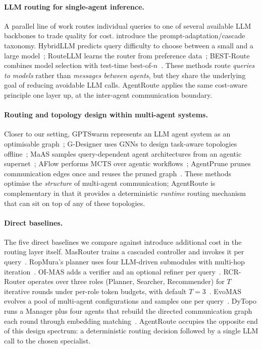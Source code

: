 \documentclass[11pt]{article}
\begin{document}
\paragraph{LLM routing for single-agent inference.}
A parallel line of work routes individual queries to one of several
available LLM backbones to trade quality for cost.
\citet{chen2023frugalgpt} introduce the prompt-adaptation/cascade
taxonomy. HybridLLM predicts query difficulty to choose between a small
and a large model~\citep{ding2024hybridllm}; RouteLLM learns the router
from preference data~\citep{ong2024routellm}; BEST-Route combines model
selection with test-time best-of-$n$~\citep{ding2025bestroute}. These
methods route \emph{queries to models} rather than \emph{messages between
agents}, but they share the underlying goal of reducing avoidable LLM
calls. AgentRoute applies the same cost-aware principle one layer up, at
the inter-agent communication boundary.

\paragraph{Routing and topology design within multi-agent systems.}
Closer to our setting, GPTSwarm represents an LLM agent system as an
optimisable graph~\citep{zhuge2024gptswarm}; G-Designer uses GNNs to
design task-aware topologies offline~\citep{zhang2025gdesigner}; MaAS
samples query-dependent agent architectures from an agentic
supernet~\citep{zhang2025maas}; AFlow performs MCTS over agentic
workflows~\citep{zhang2025aflow}; AgentPrune prunes communication edges
once and reuses the pruned graph~\citep{zhang2025agentprune}. These
methods optimise the \emph{structure} of multi-agent communication;
AgentRoute is complementary in that it provides a deterministic
\emph{runtime} routing mechanism that can sit on top of any of these
topologies.

\paragraph{Direct baselines.}
The five direct baselines we compare against introduce additional cost in
the routing layer itself. MasRouter trains a cascaded controller and
invokes it per query~\citep{yue2025masrouter}. RopMura's planner uses
four LLM-driven submodules with multi-hop
iteration~\citep{wang2025ropmura}. OI-MAS adds a verifier and an optional
refiner per query~\citep{wang2026oimas}. RCR-Router operates over three
roles (Planner, Searcher, Recommender) for $T$ iterative rounds under
per-role token budgets, with default $T{=}3$~\citep{liu2025rcrrouter}.
EvoMAS evolves a pool of multi-agent configurations and samples one per
query~\citep{evomas2026}. DyTopo runs a Manager plus four agents that
rebuild the directed communication graph each round through embedding
matching~\citep{lu2026dytopo}. AgentRoute occupies the opposite end of
this design spectrum: a deterministic routing decision followed by a
single LLM call to the chosen specialist.
\end{document}
